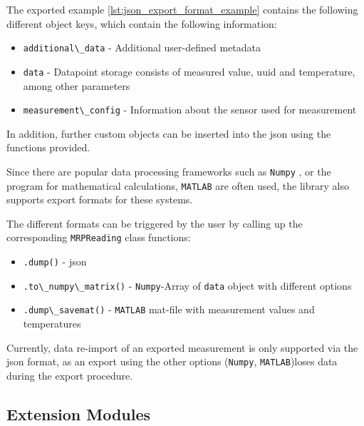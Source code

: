 The exported example \ref{lst:json_export_format_example} contains the
following different object keys, which contain the following
information:

\begin{itemize}
\tightlist
\item
  \passthrough{\lstinline!additional\_data!} - Additional user-defined
  metadata
\item
  \passthrough{\lstinline!data!} - Datapoint storage consists of
  measured value, \gls{uuid} and temperature, among other parameters
\item
  \passthrough{\lstinline!measurement\_config!} - Information about the
  sensor used for measurement
\end{itemize}

In addition, further custom objects can be inserted into the \gls{json}
using the functions provided.

Since there are popular data processing frameworks such as
\passthrough{\lstinline!Numpy!} \cite{harris2020array}, or the
program for mathematical calculations, \passthrough{\lstinline!MATLAB!}
are often used, the library also supports export formats for these
systems.

The different formats can be triggered by the user by calling up the
corresponding \passthrough{\lstinline!MRPReading!} class functions:

\begin{itemize}
\tightlist
\item
  \passthrough{\lstinline!.dump()!} - \gls{json}
\item
  \passthrough{\lstinline!.to\_numpy\_matrix()!} -
  \passthrough{\lstinline!Numpy!}-Array of
  \passthrough{\lstinline!data!} object with different options
\item
  \passthrough{\lstinline!.dump\_savemat()!} -
  \passthrough{\lstinline!MATLAB!} mat-file with measurement values and
  temperatures
\end{itemize}

Currently, data re-import of an exported measurement is only supported
via the \gls{json} format, as an export using the other options
(\passthrough{\lstinline!Numpy!}, \passthrough{\lstinline!MATLAB!})loses
data during the export procedure.

\hypertarget{extension-modules}{%
\subsection{Extension Modules}\label{extension-modules}}

